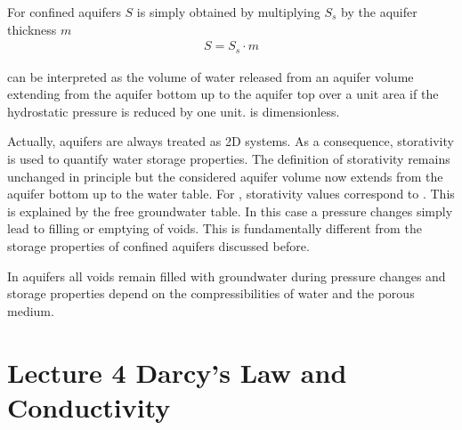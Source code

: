 \documentclass[letterpaper,10pt,english]{sphinxmanual}
\let\sphinxpxdimen\pdfpxdimen\else\newdimen\sphinxpxdimen
\begin{document}
For confined aquifers \(S\) is simply obtained by multiplying \(S_s\) by the aquifer thickness \(m\)
\begin{equation*}
\begin{split}
S = S_s \cdot m
\end{split}
\end{equation*}
\noindent{\hspace*{\fill}\sphinxincludegraphics[width=500\sphinxpxdimen]{{L03_f_14}.png}\hspace*{\fill}}

 can be interpreted as the volume of water released from an aquifer volume extending from the aquifer bottom up to the aquifer top over a unit area if the hydrostatic pressure is reduced by one unit.  is dimensionless.

Actually,  aquifers are always treated as 2D systems. As a consequence, storativity is used to quantify water storage properties. The definition of storativity remains unchanged in principle but the considered aquifer volume now extends from the aquifer bottom up to the water table. For , storativity values correspond to . This is explained by the free groundwater table. In this case a pressure changes simply lead to filling or emptying of voids. This is fundamentally different from the storage properties of confined aquifers discussed before.

In  aquifers all voids remain filled with groundwater during pressure changes and storage properties depend on the compressibilities of water and the porous medium.

\begin{sphinxVerbatim}[commandchars=\\\{\}]
   
   
   
\end{sphinxVerbatim}


\section{Lecture 4 \sphinxhyphen{} Darcy’s Law and Conductivity}
\label{\detokenize{contents/flow/lecture_04/14_darcy_law_K:lecture-4-darcy-s-law-and-conductivity}}\label{\detokenize{contents/flow/lecture_04/14_darcy_law_K::doc}}
\end{document}
